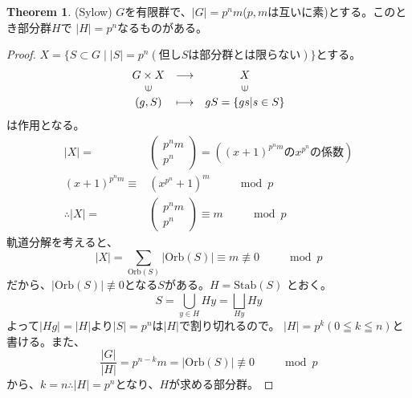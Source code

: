 \documentclass{ltjsarticle}
\theoremstyle{definition}
\newtheorem{theorem}[definition]{Theorem}
\begin{document}
\begin{theorem}\label{sylow}(Sylow)
  $G$を有限群で、$|G|=p^nm$($p,m$は互いに素)とする。このとき部分群$H$で
  $|H|=p^n$なるものがある。 
\end{theorem}
\begin{proof}
  $X=\{S\subset G\mid |S|=p^n(\mathrm{但し}S\mathrm{は部分群とは限らない})\}$とする。\\
  \[\begin{array}{ccc}
    G\times X               &\longrightarrow &X\\
    \rotatebox{90}{$\in$} &                &\rotatebox{90}{$\in$}\\
    (g,S)                   &\longmapsto      &gS=\{gs|s\in S\}\\
  \end{array}\]
  は作用となる。
  \begin{align*}
                   |X|=&\left(
                              \begin{array}{c}
                                     p^nm\\
                                     p^n
                              \end{array}
                         \right)
                      =\left((x+1)^{p^nm}\mathrm{の}x^{p^n}\mathrm{の係数}\right) \\ 
    (x+1)^{p^nm}\equiv &(x^{p^{n}}+1)^m\qquad \mod p\\
    \therefore |X|=&\left(
                          \begin{array}{c}
                                  p^nm\\
                                  p^n
                          \end{array}
                    \right)
                  \equiv m\qquad \mod p
  \end{align*}
  軌道分解を考えると、\\
  \[|X|=\sum_{\mathrm{Orb}(S)}\left|\mathrm{Orb}(S)\right|\equiv m\not\equiv 0\qquad \mod p\]
  だから、$\left|\mathrm{Orb}(S)\right|\not\equiv 0$となる$S$がある。$H=\mathrm{Stab}(S)$
  とおく。
  \[S=\bigcup _{y\in H}Hy=\bigsqcup _{Hy}Hy\]
  よって$|Hg|=|H|$より$|S|=p^n$は$|H|$で割り切れるので。
  $|H|=p^k(0\leqq k\leqq n)$と書ける。また、
  \[\frac{|G|}{|H|}=p^{n-k}m
  =\left|\mathrm{Orb}(S)\right|\not\equiv0\qquad \mod p\]
  から、$k=n\therefore |H|=p^n$となり、$H$が求める部分群。
\end{proof}
\newpage
\end{document}
